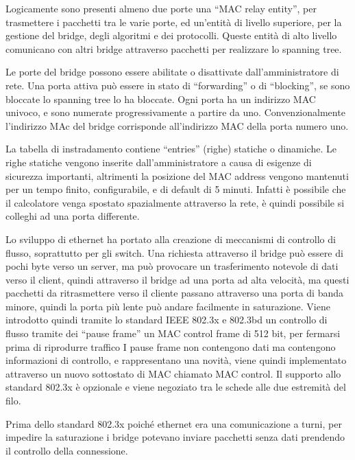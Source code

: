 \documentclass{article}
\numberwithin{equation}{subsection}
\begin{document}
Logicamente sono presenti almeno due porte una ``MAC relay entity'', per trasmettere i pacchetti tra le varie porte, ed un'entità di livello superiore, per la gestione 
del bridge, degli algoritmi e dei protocolli. Queste entità di alto livello comunicano con altri bridge attraverso pacchetti per realizzare lo spanning tree. 

Le porte del bridge possono essere abilitate o disattivate dall'amministratore di rete. Una porta attiva può essere in stato di ``forwarding'' o di ``blocking'', se sono 
bloccate lo spanning tree lo ha bloccate. Ogni porta ha un indirizzo MAC univoco, e sono numerate progressivamente a partire da uno. Convenzionalmente l'indirizzo MAc 
del bridge corrisponde all'indirizzo MAC della porta numero uno. 

La tabella di instradamento contiene ``entries'' (righe) statiche o dinamiche. Le righe statiche vengono inserite dall'amministratore a causa di esigenze di sicurezza 
importanti, altrimenti la posizione del MAC address vengono mantenuti per un tempo finito, configurabile, e di default di 5 minuti. Infatti è possibile che il calcolatore 
venga spostato spazialmente attraverso la rete, è quindi possibile si colleghi ad una porta differente. 


Lo sviluppo di ethernet ha portato alla creazione di meccanismi di controllo di flusso, soprattutto per gli switch. Una richiesta attraverso il bridge può essere di 
pochi byte verso un server, ma può provocare un trasferimento notevole di dati verso il client, quindi attraverso il bridge ad una porta ad alta velocità, ma questi 
pacchetti da ritrasmettere verso il cliente passano attraverso una porta di banda minore, quindi la porta più lente può andare facilmente in saturazione. 
Viene introdotto quindi tramite lo standard IEEE 802.3x e 802.3bd un controllo di flusso tramite dei ``pause frame'' un MAC control frame di 512 bit, per fermarsi 
prima di riprodurre traffico I pause frame non contengono dati ma contengono informazioni di controllo, e rappresentano una novità, viene quindi implementato 
attraverso un nuovo sottostato di MAC chiamato MAC control. Il supporto allo standard 802.3x è opzionale e viene negoziato tra le schede alle due estremità del filo. 

Prima dello standard 802.3x poiché ethernet era una comunicazione a turni, per impedire la saturazione i bridge potevano inviare pacchetti senza dati prendendo il 
controllo della connessione. 
\end{document}
